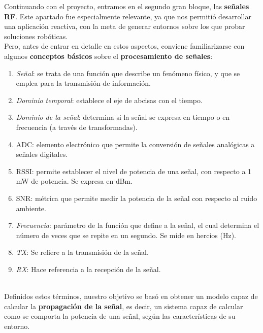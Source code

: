 Continuando con el proyecto, entramos en el segundo gran bloque, las \textbf{señales \ac{RF}}. Este apartado fue especialmente relevante, ya que nos permitió desarrollar una aplicación reactiva, con la meta de generar entornos sobre los que probar soluciones robóticas.\\

Pero, antes de entrar en detalle en estos aspectos, conviene familiarizarse con algunos \textbf{conceptos básicos} sobre el \textbf{procesamiento de señales}:

\begin{enumerate}
	\item \emph{Señal}: se trata de una función que describe un fenómeno físico, y que se emplea para la transmisión de información.

    \item \emph{Dominio temporal}: establece el eje de abcisas con el tiempo.

    \item \emph{Dominio de la señal}: determina si la señal se expresa en tiempo o en frecuencia (a través de transformadas).

    \item \ac{ADC}: elemento electrónico que permite la conversión de señales analógicas a señales digitales.

    \item \ac{RSSI}: permite establecer el nivel de potencia de una señal, con respecto a 1 mW de potencia. Se expresa en dBm.

    \item \ac{SNR}: métrica que permite medir la potencia de la señal con respecto al ruido ambiente.

    \item \emph{Frecuencia}: parámetro de la función que define a la señal, el cual determina el número de veces que se repite en un segundo. Se mide en hercios (Hz).

    \item \emph{TX}: Se refiere a la transmisión de la señal.

    \item \emph{RX}: Hace referencia a la recepción de la señal.
\end{enumerate} \cite{basics-signals}\\

Definidos estos términos, nuestro objetivo se basó en obtener un modelo capaz de calcular la \textbf{propagación de la señal}, es decir, un sistema capaz de calcular como se comporta la potencia de una señal, según las características de su entorno.\\

